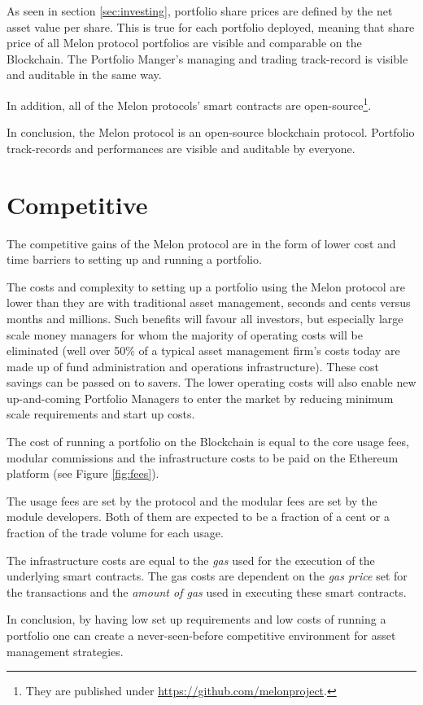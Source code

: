 \documentclass[9pt,oneside]{amsart}
\theoremstyle{plain}
\begin{document}
\begin{multicols}{2}
As seen in section \ref{sec:investing}, portfolio share prices are defined by the net asset value per share. This is true for each portfolio deployed, meaning that share price of all Melon protocol portfolios are visible and comparable on the Blockchain. The Portfolio Manger's managing and trading track-record is visible and auditable in the same way.

In addition, all of the Melon protocols' smart contracts are open-source\footnote{They are published under \url{https://github.com/melonproject}.}. 

In conclusion, the Melon protocol is an open-source blockchain protocol. Portfolio track-records and performances are visible and auditable by everyone.

\section{Competitive}\label{sec:competitive}

The competitive gains of the Melon protocol are in the form of lower cost and time barriers to setting up and running a portfolio.

The costs and complexity to setting up a portfolio using the Melon protocol are lower than they are with traditional asset management, seconds and cents versus months and millions. Such benefits will favour all investors, but especially large scale money managers for whom the majority of operating costs will be eliminated (well over 50\% of a typical asset management firm’s costs today are made up of fund administration and operations infrastructure\cite{kpmg}). These cost savings can be passed on to savers. The lower operating costs will also enable new up-and-coming Portfolio Managers to enter the market by reducing minimum scale requirements and start up costs.

The cost of running a portfolio on the Blockchain is equal to the core usage fees, modular commissions and the infrastructure costs to be paid on the Ethereum platform (see Figure \ref{fig:fees}). 

The usage fees are set by the protocol and the modular fees are set by the module developers. Both of them are expected to be a fraction of a cent or a fraction of the trade volume for each usage.

The infrastructure costs are equal to the \textit{gas} used for the execution of the underlying smart contracts. The gas costs are dependent on the \textit{gas price} set for the transactions and the \textit{amount of gas} used in executing these smart contracts\cite{yellow}.

In conclusion, by having low set up requirements and low costs of running a portfolio one can create a never-seen-before competitive environment for asset management strategies.

\end{multicols}
\end{document}
